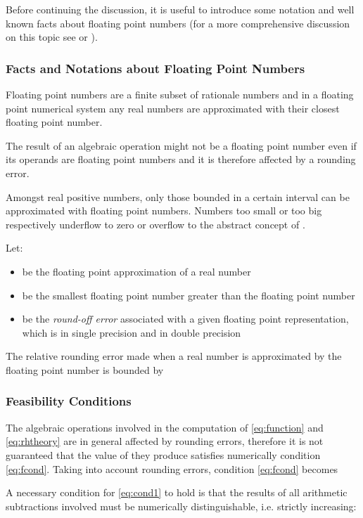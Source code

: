 \documentclass[preprint,1p,times]{elsarticle}
\begin{document}
Before continuing the discussion, it is useful to introduce some notation and well known facts about floating point numbers (for a more comprehensive discussion on this topic see \cite{Johnson1982} or \cite{Goldberg1991}).

\subsubsection{Facts and Notations about Floating Point Numbers}
Floating point numbers are a finite subset of rationale numbers and in a floating point numerical system any real numbers are approximated with their closest floating point number.

The result of an algebraic operation might not be a floating point number even if its operands are floating point numbers and it is therefore affected by a rounding error.

Amongst real positive numbers, only those bounded in a certain interval can be approximated with floating point numbers. Numbers too small or too big respectively underflow to zero or overflow to the abstract concept of .

Let: 
\begin{itemize}
\item  be the floating point approximation of a real number 
\item  be the smallest floating point number greater than the floating point number 
\item  be the \textit{round-off error} associated with a given floating point representation, which is  in single precision and  in double precision
\end{itemize}

The relative rounding error made when a real number  is approximated by the floating point number  is bounded by


\subsubsection{Feasibility Conditions}
The algebraic operations involved in the computation of \eqref{eq:function} and \eqref{eq:rhtheory} are in general affected by rounding errors, therefore it is not guaranteed that the value of  they produce satisfies numerically condition \eqref{eq:fcond}.
Taking into account rounding errors, condition \eqref{eq:fcond} becomes

A necessary condition for \eqref{eq:cond1} to hold is that the results of all arithmetic subtractions involved must be numerically distinguishable, i.e. strictly increasing:
\end{document}
